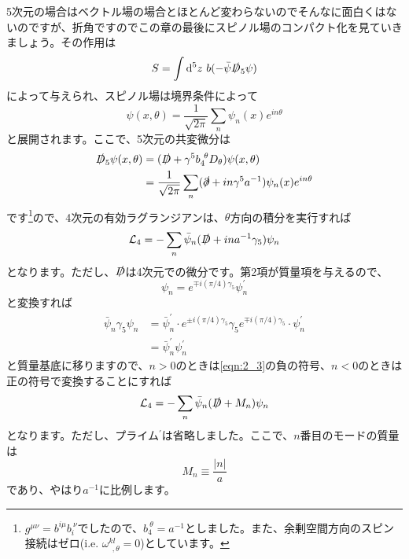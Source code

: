 \documentclass[unicode,a4paper,11pt]{ltjsarticle}
\begin{document}
5次元の場合はベクトル場の場合とほとんど変わらないのでそんなに面白くはないのですが、折角ですのでこの章の最後にスピノル場のコンパクト化を見ていきましょう。その作用は
\begin{equation}
   S
   =
   \int\dd^5 z\ b(-\bar{\psi}\slashed{D}_{5}\psi)
\end{equation}
によって与えられ、スピノル場は境界条件によって
\begin{equation}
   \psi(x,\theta)
   =
   \frac{1}{\sqrt{2\pi}}
   \sum_{n}\psi_{n}(x)e^{in\theta}
\end{equation}
と展開されます。ここで、5次元の共変微分は
\begin{align}
   \slashed{D}_{5}\psi(x,\theta)
    & =
   (\slashed{D}+\gamma^{5}b_{4}^{\ \theta}D_{\theta})\psi(x,\theta)
   \nonumber
   \\
    & =
   \frac{1}{\sqrt{2\pi}}\sum_{n}
   (\slashed{\partial}+in\gamma^{5}a^{-1})\psi_{n}(x)e^{in\theta}
\end{align}
です\footnote{
$g^{\mu\nu}=b^{i\mu}b_{i}^{\ \nu}$でしたので、$b_{4}^{\ \theta}=a^{-1}$としました。また、余剰空間方向のスピン接続はゼロ(i.e. $\omega^{kl}_{\ \ ,\theta}=0$)としています。
}ので、4次元の有効ラグランジアンは、$\theta$方向の積分を実行すれば
\begin{equation}
   \mathcal{L}_{4}
   =
   -
   \sum_{n}\bar{\psi}_{n}(\slashed{D}+ina^{-1}\gamma_{5})\psi_{n}
\end{equation}
となります。ただし、$\slashed{D}$は4次元での微分です。第2項が質量項を与えるので、
\begin{equation}
   \psi_n
   =
   e^{\mp i(\pi/4)\gamma_{5}}\psi_{n}^{\prime}
   \label{eqn:2_3}
\end{equation}
と変換すれば
\begin{align}
   \bar{\psi}_{n}\gamma_{5}\psi_{n}
    & =
   \bar{\psi}_{n}^{\prime}
   \cdot
   e^{\pm i(\pi/4)\gamma_{5}}\gamma_{5}e^{\mp i(\pi/4)\gamma_{5}}
   \cdot
   \psi_{n}^{\prime}
   \nonumber
   \\
    & =
   \bar{\psi}_{n}^{\prime}
   \psi_{n}^{\prime}
\end{align}
と質量基底に移りますので、$n>0$のときは\eqref{eqn:2_3}の負の符号、$n<0$のときは正の符号で変換することにすれば
\begin{equation}
   \mathcal{L}_{4}
   =
   -
   \sum_{n}\bar{\psi}_{n}(\slashed{D}+M_{n})\psi_{n}
\end{equation}
となります。ただし、プライム$^{\prime}$は省略しました。ここで、$n$番目のモードの質量は
\begin{equation}
   M_{n}
   \equiv
   \frac{|n|}{a}
\end{equation}
であり、やはり$a^{-1}$に比例します。
\end{document}
